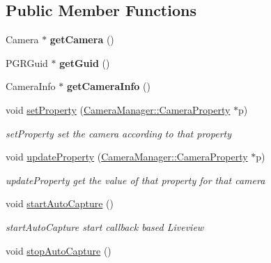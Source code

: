 \subsection*{Public Member Functions}
\begin{DoxyCompactItemize}
\item 
\hypertarget{class_fly_camera_a3176768aac0905151237c2e9633c8c47}{Camera $\ast$ {\bfseries get\-Camera} ()}\label{class_fly_camera_a3176768aac0905151237c2e9633c8c47}

\item 
\hypertarget{class_fly_camera_ae5b32f2f930f8903fde35a5aeeb059b6}{P\-G\-R\-Guid $\ast$ {\bfseries get\-Guid} ()}\label{class_fly_camera_ae5b32f2f930f8903fde35a5aeeb059b6}

\item 
\hypertarget{class_fly_camera_abfba126bfff4fee7042710451b198286}{Camera\-Info $\ast$ {\bfseries get\-Camera\-Info} ()}\label{class_fly_camera_abfba126bfff4fee7042710451b198286}

\item 
void \hyperlink{class_fly_camera_ad9d4102cab167f0d5739b2af808c43ee}{set\-Property} (\hyperlink{class_camera_manager_1_1_camera_property}{Camera\-Manager\-::\-Camera\-Property} $\ast$p)
\begin{DoxyCompactList}\small\item\em set\-Property set the camera according to that property \end{DoxyCompactList}\item 
void \hyperlink{class_fly_camera_a8f87a0d8ccbee558e629189e2c8ab271}{update\-Property} (\hyperlink{class_camera_manager_1_1_camera_property}{Camera\-Manager\-::\-Camera\-Property} $\ast$p)
\begin{DoxyCompactList}\small\item\em update\-Property get the value of that property for that camera \end{DoxyCompactList}\item 
\hypertarget{class_fly_camera_aa91c2cd580029a1fb242e2d8dace33b7}{void \hyperlink{class_fly_camera_aa91c2cd580029a1fb242e2d8dace33b7}{start\-Auto\-Capture} ()}\label{class_fly_camera_aa91c2cd580029a1fb242e2d8dace33b7}

\begin{DoxyCompactList}\small\item\em start\-Auto\-Capture start callback based Liveview \end{DoxyCompactList}\item 
\hypertarget{class_fly_camera_a7d637bd9237fae3ee3cd55b044ec80f1}{void \hyperlink{class_fly_camera_a7d637bd9237fae3ee3cd55b044ec80f1}{stop\-Auto\-Capture} ()}\label{class_fly_camera_a7d637bd9237fae3ee3cd55b044ec80f1}


\end{DoxyCompactItemize}
